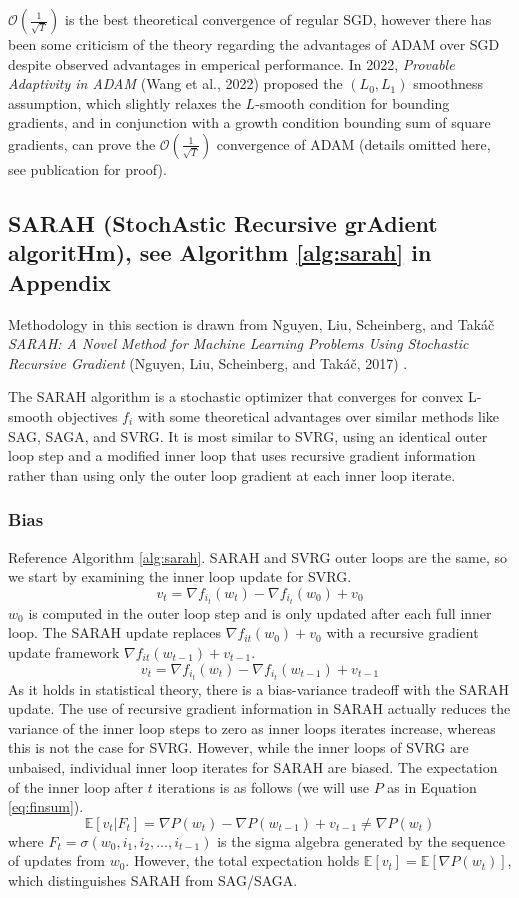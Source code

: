 \documentclass[letterpaper,11 pt]{article}
\begin{document}
$\mathcal{O}\left(\frac{1}{\sqrt{T}}\right)$ is the best theoretical convergence of regular SGD, however there has been some criticism of the theory regarding the advantages of ADAM over SGD despite observed advantages in emperical performance.  In 2022, \textit{Provable Adaptivity in ADAM} (Wang et al., 2022) \cite{wangprovable} proposed the $(L_{0},L_{1})$ smoothness assumption, which slightly relaxes the $L$-smooth condition for bounding gradients, and in conjunction with a growth condition bounding sum of square gradients, can prove the $\mathcal{O}\left(\frac{1}{\sqrt{T}}\right)$ convergence of ADAM (details omitted here, see publication for proof).
%


\subsection{SARAH (StochAstic Recursive grAdient algoritHm), see Algorithm \ref{alg:sarah} in Appendix}
Methodology in this section is drawn from Nguyen, Liu, Scheinberg, and Takáč \textit{SARAH: A Novel Method for Machine Learning Problems Using Stochastic Recursive Gradient} (Nguyen, Liu, Scheinberg, and Takáč, 2017)  \cite{nguyen}.

The SARAH algorithm is a stochastic optimizer that converges for convex L-smooth objectives $f_{i}$ with some theoretical advantages over similar methods like SAG, SAGA, and SVRG. It is most similar to SVRG, using an identical outer loop step and a modified inner loop that uses recursive gradient information rather than using only the outer loop gradient at each inner loop iterate.


\subsubsection{Bias}

Reference Algorithm \ref{alg:sarah}. SARAH and SVRG outer loops are the same, so we start by examining the inner loop update for SVRG.
\[
v_{t} = \nabla f_{i_{t}} (w_{t}) - \nabla f_{i_{t}} (w_{0}) + v_{0}
\]
$w_{0}$ is computed in the outer loop step and is only updated after each full inner loop. The SARAH update replaces $\nabla f_{it}(w_{0})+v_{0}$ with a recursive gradient update framework $\nabla f_{it}(w_{t-1})+v_{t-1}$.
\[
v_{t} = \nabla f_{i_{t}} (w_{t}) - \nabla f_{i_{t}} (w_{t-1}) + v_{t-1}
\]
As it holds in statistical theory, there is a bias-variance tradeoff with the SARAH update. The use of recursive gradient information in SARAH actually reduces the variance of the inner loop steps to zero as inner loops iterates increase, whereas this is not the case for SVRG. However, while the inner loops of SVRG are unbaised, individual inner loop iterates for SARAH are biased. The expectation of the inner loop after $t$ iterations is as follows (we will use $P$ as in Equation \ref{eq:finsum}).
\[
\mathbb{E}[v_{t}|F_{t}]=\nabla{P}(w_{t}) - \nabla{P}(w_{t-1}) + v_{t-1} \neq \nabla{P}(w_{t})
\]
where $F_{t} = \sigma (w_{0}, i_{1},i_{2},...,i_{t-1})$ is the sigma algebra generated by the sequence of updates from $w_{0}$.  However, the total expectation holds $\mathbb{E}[v_{t}] = \mathbb{E}[\nabla{P}(w_{t})]$, which distinguishes SARAH from SAG/SAGA.
\end{document}
